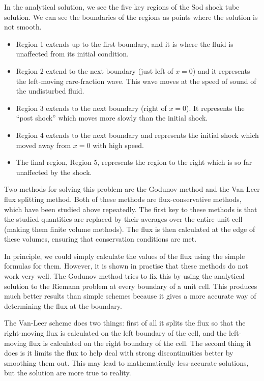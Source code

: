 \documentclass[twocolumn]{myarticle}
\begin{document}
In the analytical solution, we see the five key regions of the Sod shock tube solution.
We can see the boundaries of the regions as points where the solution is not smooth.
\begin{itemize}
\item
    Region 1 extends up to the first boundary, and it is where the fluid is unaffected from its initial condition.
\item
    Region 2 extend to the next boundary (just left of $ x = 0 $) and it represents the left-moving rare-fraction wave.
    This wave moves at the speed of sound of the undisturbed fluid.
\item
    Region 3 extends to the next boundary (right of $ x = 0 $).
    It represents the ``post shock'' which moves more slowly than the initial shock.
\item
    Region 4 extends to the next boundary and represents the initial shock which moved away from $ x = 0 $ with high speed.
\item
    The final region, Region 5, represents the region to the right which is so far unaffected by the shock.
\end{itemize}

Two methods for solving this problem are the Godunov method and the Van-Leer flux splitting method.
Both of these methods are flux-conservative methods, which have been studied above repeatedly.
The first key to these methods is that the studied quantities are replaced by their averages over the entire unit cell (making them finite volume methods).
The flux is then calculated at the edge of these volumes, ensuring that conservation conditions are met.

In principle, we could simply calculate the values of the flux using the simple formulas for them.
However, it is shown in practise that these methods do not work very well.
The Godunov method tries to fix this by using the analytical solution to the Riemann problem at every boundary of a unit cell.
This produces much better results than simple schemes because it gives a more accurate way of determining the flux at the boundary.

The Van-Leer scheme does two things: first of all it splits the flux so that the right-moving flux is calculated on the left boundary of the cell, and the left-moving flux is calculated on the right boundary of the cell.
The second thing it does is it limits the flux to help deal with strong discontinuities better by smoothing them out.
This may lead to mathematically less-accurate solutions, but the solution are more true to reality.
\end{document}
